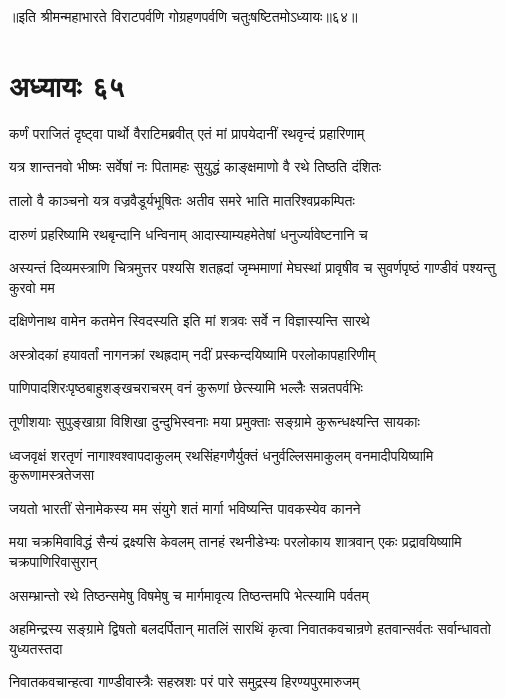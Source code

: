 ॥इति श्रीमन्महाभारते विराटपर्वणि गोग्रहणपर्वणि चतुःषष्टितमोऽध्यायः॥६४॥

\chapter{अध्यायः ६५}

\twolineshloka
{कर्णं पराजितं दृष्ट्वा पार्थो वैराटिमब्रवीत्}
{एतं मां प्रापयेदानीं रथवृन्दं प्रहारिणाम्}


\twolineshloka
{यत्र शान्तनवो भीष्मः सर्वेषां नः पितामहः}
{सुयुद्धं काङ्क्षमाणो वै रथे तिष्ठति दंशितः}


\twolineshloka
{तालो वै काञ्चनो यत्र वज्रवैडूर्यभूषितः}
{अतीव समरे भाति मातरिश्वप्रकम्पितः}


\twolineshloka
{दारुणं प्रहरिष्यामि रथबृन्दानि धन्विनाम्}
{आदास्याम्यहमेतेषां धनुर्ज्यावेष्टनानि च}


\onelineshloka
{अस्यन्तं दिव्यमस्त्राणि चित्रमुत्तर पश्यसि}
\twolineshloka
{शतह्रदां जृम्भमाणां मेघस्थां प्रावृषीव च}
{सुवर्णपृष्ठं गाण्डीवं पश्यन्तु कुरवो मम}


\twolineshloka
{दक्षिणेनाथ वामेन कतमेन स्विदस्यति}
{इति मां शत्रवः सर्वे न विज्ञास्यन्ति सारथे}


\twolineshloka
{अस्त्रोदकां हयावर्तां नागनक्रां रथह्रदाम्}
{नदीं प्रस्कन्दयिष्यामि परलोकापहारिणीम्}


\twolineshloka
{पाणिपादशिरःपृष्ठबाहुशङ्खचराचरम्}
{वनं कुरूणां छेत्स्यामि भल्लैः सन्नतपर्वभिः}


\twolineshloka
{तूणीशयाः सुपुङ्खाग्रा विशिखा दुन्दुभिस्वनाः}
{मया प्रमुक्ताः सङ्ग्रामे कुरून्धक्ष्यन्ति सायकाः}


\threelineshloka
{ध्वजवृक्षं शरतृणं नागाश्वश्वापदाकुलम्}
{रथसिंहगणैर्युक्तं धनुर्वल्लिसमाकुलम्}
{वनमादीपयिष्यामि कुरूणामस्त्रतेजसा}


\twolineshloka
{जयतो भारतीं सेनामेकस्य मम संयुगे}
{शतं मार्गा भविष्यन्ति पावकस्येव कानने}


\threelineshloka
{मया चक्रमिवाविद्धं सैन्यं द्रक्ष्यसि केवलम्}
{तानहं रथनीडेभ्यः परलोकाय शात्रवान्}
{एकः प्रद्रावयिष्यामि चक्रपाणिरिवासुरान्}


\twolineshloka
{असम्भ्रान्तो रथे तिष्ठन्समेषु विषमेषु च}
{मार्गमावृत्य तिष्ठन्तमपि भेत्स्यामि पर्वतम्}


\threelineshloka
{अहमिन्द्रस्य सङ्ग्रामे द्विषतो बलदर्पितान्}
{मातलिं सारथिं कृत्वा निवातकवचान्रणे}
{हतवान्सर्वतः सर्वान्धावतो युध्यतस्तदा}


\twolineshloka
{निवातकवचान्हत्वा गाण्डीवास्त्रैः सहस्रशः}
{परं पारे समुद्रस्य हिरण्यपुरमारुजम्}


